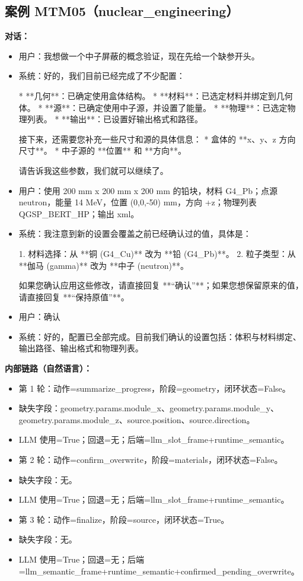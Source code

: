 \documentclass[11pt]{ctexart}
\begin{document}
\subsection{案例 MTM05（nuclear\_engineering）}
\textbf{对话：}
\begin{itemize}
\item 用户：我想做一个中子屏蔽的概念验证，现在先给一个缺参开头。
\item 系统：好的，我们目前已经完成了不少配置：

*   **几何**：已确定使用盒体结构。
*   **材料**：已选定材料并绑定到几何体。
*   **源**：已确定使用中子源，并设置了能量。
*   **物理**：已选定物理列表。
*   **输出**：已设置好输出格式和路径。

接下来，还需要您补充一些尺寸和源的具体信息：
*   盒体的 **x、y、z 方向尺寸**。
*   中子源的 **位置** 和 **方向**。

请告诉我这些参数，我们就可以继续了。
\item 用户：使用 200 mm x 200 mm x 200 mm 的铅块，材料 G4\_Pb；点源 neutron，能量 14 MeV，位置 (0,0,-50) mm，方向 +z；物理列表 QGSP\_BERT\_HP；输出 xml。
\item 系统：我注意到新的设置会覆盖之前已经确认过的值，具体是：

1.  材料选择：从 **铜 (G4\_Cu)** 改为 **铅 (G4\_Pb)**。
2.  粒子类型：从 **伽马 (gamma)** 改为 **中子 (neutron)**。

如果您确认应用这些修改，请直接回复 **“确认”**；如果您想保留原来的值，请直接回复 **“保持原值”**。
\item 用户：确认
\item 系统：好的，配置已全部完成。目前我们确认的设置包括：体积与材料绑定、输出路径、输出格式和物理列表。
\end{itemize}
\textbf{内部链路（自然语言）：}
\begin{itemize}
\item 第 1 轮：动作=summarize\_progress，阶段=geometry，闭环状态=False。
\item 缺失字段：geometry.params.module\_x、geometry.params.module\_y、geometry.params.module\_z、source.position、source.direction。
\item LLM 使用=True；回退=无；后端=llm\_slot\_frame+runtime\_semantic。
\item 第 2 轮：动作=confirm\_overwrite，阶段=materials，闭环状态=False。
\item 缺失字段：无。
\item LLM 使用=True；回退=无；后端=llm\_slot\_frame+runtime\_semantic。
\item 第 3 轮：动作=finalize，阶段=source，闭环状态=True。
\item 缺失字段：无。
\item LLM 使用=True；回退=无；后端=llm\_semantic\_frame+runtime\_semantic+confirmed\_pending\_overwrite。
\end{itemize}
\end{document}
